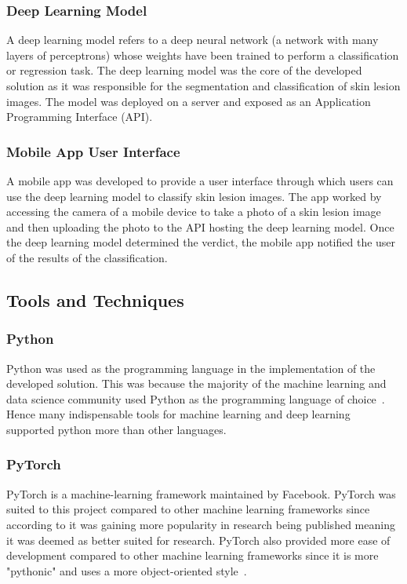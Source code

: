 \documentclass[12pt, a4paper]{article}
\begin{document}
\subsubsection{Deep Learning Model}
A deep learning model refers to a deep neural network (a network with many layers of perceptrons) whose weights have been trained to perform a classification or regression task. The deep learning model was the core of the developed solution as it was responsible for the segmentation and classification of skin lesion images. The model was deployed on a server and exposed as an Application Programming Interface (API).
\subsubsection{Mobile App User Interface}
A mobile app was developed to provide a user interface through which users can use the deep learning model to classify skin lesion images. The app worked by accessing the camera of a mobile device to take a photo of a skin lesion image and then uploading the photo to the API hosting the deep learning model. Once the deep learning model determined the verdict, the mobile app notified the user of the results of the classification.
\subsection{Tools and Techniques}
\subsubsection{Python}
Python was used as the programming language in the implementation of the developed solution. This was because the majority of the machine learning and data science community used Python as the programming language of choice~\citep{raschka2015python}. Hence many indispensable tools for machine learning and deep learning supported python more than other languages.
\subsubsection{PyTorch}
PyTorch is a machine-learning framework maintained by Facebook. PyTorch was suited to this project compared to other machine learning frameworks since according to \cite{he2019mlframeworks} it was gaining more popularity in research being published meaning it was deemed as better suited for research. PyTorch also provided more ease of development compared to other machine learning frameworks since it is more "pythonic" and uses a more object-oriented style~\citep{simmons2019comparison}.
\end{document}
